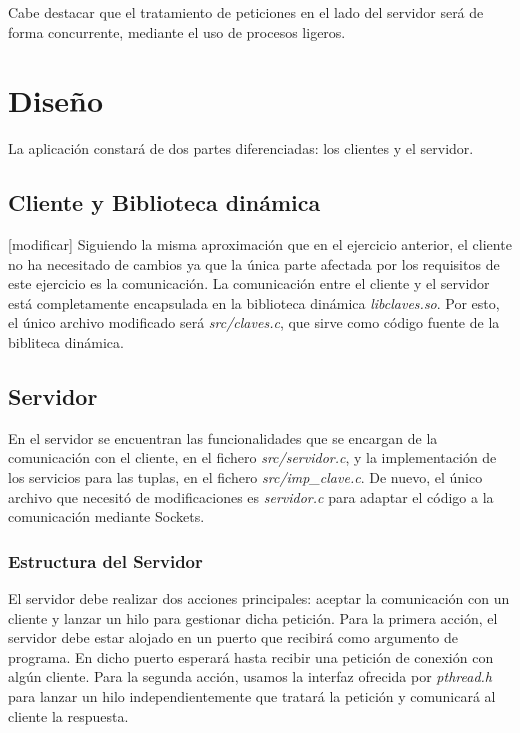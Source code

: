 \documentclass[]{article}
\begin{document}
Cabe destacar que el tratamiento de peticiones en el lado del servidor será de forma concurrente, mediante el uso de procesos ligeros. 

\section{Diseño}
\label{sec:disenno}
La aplicación constará de dos partes diferenciadas: los clientes y el servidor.

\subsection{Cliente y Biblioteca dinámica}
\label{subsec:cliente_biblioteca}
[modificar]
Siguiendo la misma aproximación que en el ejercicio anterior, el cliente no ha necesitado de cambios ya que la única parte afectada por los requisitos de este ejercicio es la comunicación. La comunicación entre el cliente y el servidor está completamente encapsulada en la biblioteca dinámica \textit{libclaves.so}. Por esto, el único archivo modificado será \textit{src/claves.c}, que sirve como código fuente de la bibliteca dinámica.


\subsection{Servidor}
\label{subsec:servidor}
En el servidor se encuentran las funcionalidades que se encargan de la comunicación con el cliente, en el fichero \textit{src/servidor.c}, y la implementación de los servicios para las tuplas, en el fichero \textit{src/imp\_clave.c}. De nuevo, el único archivo que necesitó de modificaciones es \textit{servidor.c} para adaptar el código a la comunicación mediante Sockets. 

\subsubsection{Estructura del Servidor}
\label{subsec::estructura_servidor}
El servidor debe realizar dos acciones principales: aceptar la comunicación con un cliente y lanzar un hilo para gestionar dicha petición. Para la primera acción, el servidor debe estar alojado en un puerto que recibirá como argumento de programa. En dicho puerto esperará hasta recibir una petición de conexión con algún cliente. Para la segunda acción, usamos la interfaz ofrecida por \textit{pthread.h} para lanzar un hilo independientemente que tratará la petición y comunicará al cliente la respuesta. 
\end{document}
